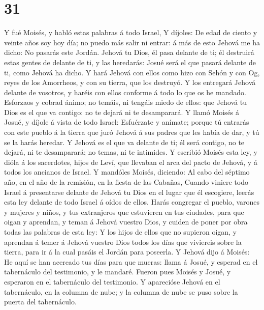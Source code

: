 \hypertarget{section-30}{%
\section{31}\label{section-30}}

 Y fué Moisés, y habló estas palabras á todo Israel,
 Y díjoles: De edad de ciento y veinte años soy hoy día; no
puedo más salir ni entrar: á más de esto Jehová me ha dicho: No pasarás
este Jordán.  Jehová tu Dios, él pasa delante de ti; él
destruirá estas gentes de delante de ti, y las heredarás: Josué será el
que pasará delante de ti, como Jehová ha dicho.  Y hará
Jehová con ellos como hizo con Sehón y con Og, reyes de los Amorrheos, y
con su tierra, que los destruyó.  Y los entregará Jehová
delante de vosotros, y haréis con ellos conforme á todo lo que os he
mandado.  Esforzaos y cobrad ánimo; no temáis, ni tengáis
miedo de ellos: que Jehová tu Dios es el que va contigo: no te dejará ni
te desamparará.  Y llamó Moisés á Josué, y díjole á vista de
todo Israel: Esfuérzate y anímate; porque tú entrarás con este pueblo á
la tierra que juró Jehová á sus padres que les había de dar, y tú se la
harás heredar.  Y Jehová es el que va delante de ti; él será
contigo, no te dejará, ni te desamparará; no temas, ni te intimides.
 Y escribió Moisés esta ley, y dióla á los sacerdotes, hijos
de Leví, que llevaban el arca del pacto de Jehová, y á todos los
ancianos de Israel.  Y mandóles Moisés, diciendo: Al cabo
del séptimo año, en el año de la remisión, en la fiesta de las Cabañas,
 Cuando viniere todo Israel á presentarse delante de Jehová
tu Dios en el lugar que él escogiere, leerás esta ley delante de todo
Israel á oídos de ellos.  Harás congregar el pueblo,
varones y mujeres y niños, y tus extranjeros que estuvieren en tus
ciudades, para que oigan y aprendan, y teman á Jehová vuestro Dios, y
cuiden de poner por obra todas las palabras de esta ley:  Y
los hijos de ellos que no supieron oigan, y aprendan á temer á Jehová
vuestro Dios todos los días que viviereis sobre la tierra, para ir á la
cual pasáis el Jordán para poseerla.  Y Jehová dijo á
Moisés: He aquí se han acercado tus días para que mueras: llama á Josué,
y esperad en el tabernáculo del testimonio, y le mandaré. Fueron pues
Moisés y Josué, y esperaron en el tabernáculo del testimonio.
 Y aparecióse Jehová en el tabernáculo, en la columna de
nube; y la columna de nube se puso sobre la puerta del tabernáculo.
